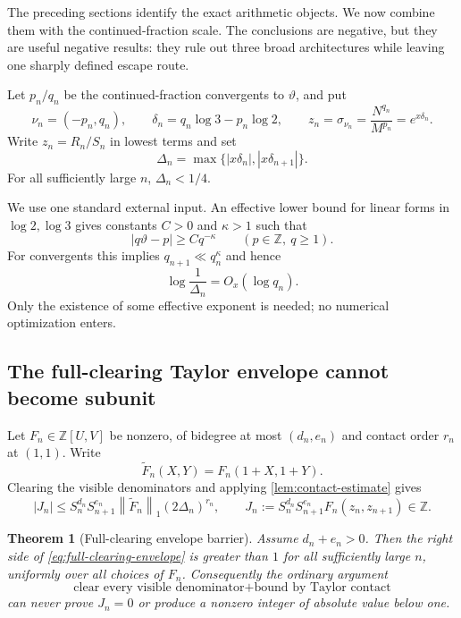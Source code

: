 \documentclass[11pt,oneside]{article}
\newtheorem{theorem}{Theorem}[section]
\theoremstyle{definition}
\theoremstyle{remark}
\newcommand{\Z}{\mathbb Z}
\newcommand{\thetaAE}{\vartheta}
\newcommand{\normone}[1]{\left\lVert #1\right\rVert_1}
\begin{document}
The preceding sections identify the exact arithmetic objects.  We now combine them with the
continued-fraction scale.  The conclusions are negative, but they are useful negative results:
they rule out three broad architectures while leaving one sharply defined escape route.

Let $p_n/q_n$ be the continued-fraction convergents to $\thetaAE$, and put
\begin{equation}
 \nu_n=(-p_n,q_n),\qquad
 \delta_n=q_n\log3-p_n\log2,\qquad
 z_n=\sigma_{\nu_n}=\frac{N^{q_n}}{M^{p_n}}=e^{x\delta_n}.
 \label{eq:convergent-near-units}
\end{equation}
Write $z_n=R_n/S_n$ in lowest terms and set
\begin{equation}
 \Delta_n=\max\{|x\delta_n|,|x\delta_{n+1}|\}.
 \label{eq:adjacent-output-error}
\end{equation}
For all sufficiently large $n$, $\Delta_n<1/4$.

We use one standard external input.  An effective lower bound for linear forms in
$\log2,\log3$ gives constants $C>0$ and $\kappa>1$ such that
\begin{equation}
 |q\thetaAE-p|\ge Cq^{-\kappa}
 \qquad(p\in\Z,\ q\ge1).
 \label{eq:effective-two-log}
\end{equation}
For convergents this implies $q_{n+1}\ll q_n^{\kappa}$ and hence
\begin{equation}
 \log\frac1{\Delta_n}=O_x(\log q_n).
 \label{eq:delta-logarithmic}
\end{equation}
Only the existence of some effective exponent is needed; no numerical optimization enters.

\subsection{The full-clearing Taylor envelope cannot become subunit}

Let $F_n\in\Z[U,V]$ be nonzero, of bidegree at most $(d_n,e_n)$ and contact order
$r_n$ at $(1,1)$.  Write
\[
 \widetilde F_n(X,Y)=F_n(1+X,1+Y).
\]
Clearing the visible denominators and applying \cref{lem:contact-estimate} gives
\begin{equation}
 |J_n|
 \le S_n^{d_n}S_{n+1}^{e_n}
       \normone{\widetilde F_n}(2\Delta_n)^{r_n},
 \qquad
 J_n:=S_n^{d_n}S_{n+1}^{e_n}F_n(z_n,z_{n+1})\in\Z.
 \label{eq:full-clearing-envelope}
\end{equation}

\begin{theorem}[Full-clearing envelope barrier]
\label{thm:full-clearing-barrier}
Assume $d_n+e_n>0$.  Then the right side of
\eqref{eq:full-clearing-envelope} is greater than $1$ for all sufficiently large $n$,
uniformly over all choices of $F_n$.  Consequently the ordinary argument
\[
 \text{clear every visible denominator}+\text{bound by Taylor contact}
\]
can never prove $J_n=0$ or produce a nonzero integer of absolute value below one.
\end{theorem}
\end{document}
